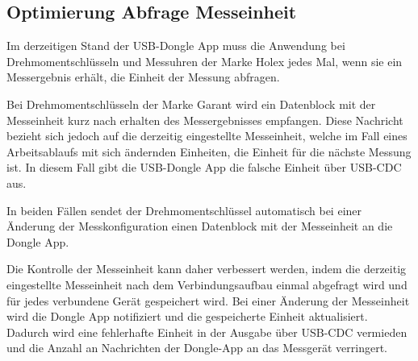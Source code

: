 \subsection{Optimierung Abfrage Messeinheit} 
Im derzeitigen Stand der USB-Dongle App muss die Anwendung bei Drehmomentschlüsseln und Messuhren der Marke Holex jedes Mal, wenn sie ein Messergebnis erhält, die Einheit der Messung abfragen. 

Bei Drehmomentschlüsseln der Marke Garant wird ein Datenblock mit der Messeinheit kurz nach erhalten des Messergebnisses empfangen. Diese Nachricht bezieht sich jedoch auf die derzeitig eingestellte Messeinheit, welche im Fall eines Arbeitsablaufs mit sich ändernden Einheiten, die Einheit für die nächste Messung ist. In diesem Fall gibt die USB-Dongle App die falsche Einheit über USB-CDC aus. 

In beiden Fällen sendet der Drehmomentschlüssel automatisch bei einer Änderung der Messkonfiguration einen Datenblock mit der Messeinheit an die Dongle App. 

Die Kontrolle der Messeinheit kann daher verbessert werden, indem die derzeitig eingestellte Messeinheit nach dem Verbindungsaufbau einmal abgefragt wird und für jedes verbundene Gerät gespeichert wird. Bei einer Änderung der Messeinheit wird die Dongle App notifiziert und die gespeicherte Einheit aktualisiert. Dadurch wird eine fehlerhafte Einheit in der Ausgabe über USB-CDC vermieden und die Anzahl an Nachrichten der Dongle-App an das Messgerät verringert.

